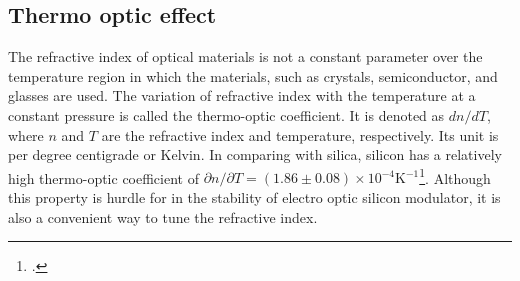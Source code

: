 \documentclass[12pt,twoside,english]{book}
\renewcommand{\~}{\perispomeni}%
\numberwithin{equation}{section}
\numberwithin{figure}{section}
\begin{document}
\subsection{Thermo optic effect}
The refractive index of optical materials is not a constant parameter over the temperature region in which the materials, such as crystals, semiconductor, and glasses are used. The variation of refractive index with the temperature at a constant pressure is called the thermo-optic coefficient. It is denoted as $dn/dT$, where $n$ and $T$ are the refractive index and temperature, respectively. Its unit is per degree centigrade or Kelvin. In comparing with silica, silicon has a relatively high thermo-optic coefficient of $\partial n/\partial T=\left(1.86\pm0.08\right)\times10^{-4}\text{K}^{-1}$\footcite{Cocorullo:1992p1595}. Although this property is hurdle for in the stability of electro optic silicon modulator, it is also a convenient way to tune the refractive index.

\end{document}

